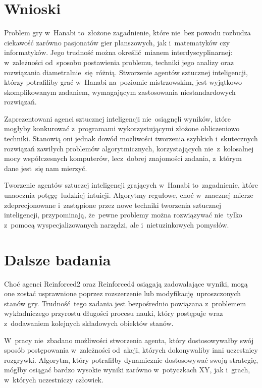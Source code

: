 \documentclass[declaration,shortabstract,inz]{iithesis}
\begin{document}
\chapter{Wnioski}

Problem gry w~Hanabi to~złożone zagadnienie, które nie~bez powodu rozbudza ciekawość zarówno pasjonatów gier planszowych, jak i~matematyków czy informatyków. Jego trudność można określić mianem interdyscyplinarnej: w~zależności od~sposobu postawienia problemu, techniki jego analizy oraz rozwiązania diametralnie~się różnią. Stworzenie agentów sztucznej inteligencji, którzy potrafiliby grać w~Hanabi na~poziomie mistrzowskim, jest wyjątkowo skomplikowanym zadaniem, wymagającym zastosowania niestandardowych rozwiązań.

Zaprezentowani agenci sztucznej inteligencji nie~osiągnęli wyników, które mogłyby konkurować z~programami wykorzystującymi złożone obliczeniowo techniki. Stanowią oni jednak dowód możliwości tworzenia szybkich i~skutecznych rozwiązań zawiłych problemów algorytmicznych, korzystających nie~z~kolosalnej mocy współczesnych komputerów, lecz~dobrej znajomości zadania, z~którym dane jest~się nam mierzyć.

Tworzenie agentów sztuczej inteligencji grających w~Hanabi to~zagadnienie, które unaocznia potęgę ludzkiej intuicji. Algorytmy regułowe, choć w~znacznej mierze zdeprecjonowane i~zastąpione przez nowe techniki tworzenia sztucznej inteligencji, przypominają, że~pewne problemy można rozwiązywać nie~tylko z~pomocą wyspecjalizowanych narzędzi, ale i~nietuzinkowych pomysłów.

\chapter{Dalsze badania}

Choć agenci Reinforced2 oraz Reinforced4 osiągają zadowalające wyniki, mogą one zostać usprawnione poprzez rozszerzenie lub modyfikację uproszczonych stanów gry. Trudność tego zadania jest bezpośrednio powiązana z~problemem wykładniczego przyrostu długości procesu nauki, który postępuje wraz z~dodawaniem kolejnych składowych obiektów stanów.

W~pracy nie~zbadano możliwości stworzenia agenta, który dostosowywałby swój sposób postępowania w~zależności od~akcji, których dokonywaliby inni uczestnicy rozgrywki. Algorytm, który potrafiłby dynamicznie dostosowywać swoją strategię, mógłby osiągać bardzo wysokie wyniki zarówno w~potyczkach XY, jak i~grach, w~których uczestniczy człowiek.
\end{document}
